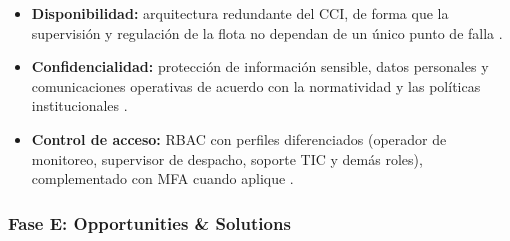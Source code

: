 \begin{singlespace}
\begin{itemize}
\begin{itemize}
		\item[$\Rightarrow$] \textbf{Disponibilidad:} arquitectura redundante del CCI, de forma que la supervisión y regulación de la flota no dependan de un único punto de falla \parencite{transmilenio2025pesi}.
		\item[$\Rightarrow$] \textbf{Confidencialidad:} protección de información sensible, datos personales y comunicaciones operativas de acuerdo con la normatividad y las políticas institucionales \parencite{transmilenio2025pesi,ley1581de2012}.
		\item[$\Rightarrow$] \textbf{Control de acceso:} RBAC con perfiles diferenciados (operador de monitoreo, supervisor de despacho, soporte TIC y demás roles), complementado con MFA cuando aplique \parencite{mintic2021,transmilenio2025pesi}.
	\end{itemize}
\end{itemize}

\subsubsection*{Fase E: Opportunities \& Solutions}


\end{singlespace}
